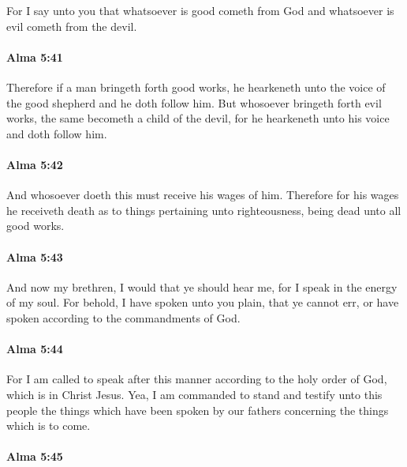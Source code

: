 			For I say unto you
			that whatsoever is good cometh from God
			and whatsoever is evil cometh from the devil.

		\paragraph{Alma 5:41} %
			\label{ALMA-5-41}

			Therefore if a man bringeth forth good works,
			he hearkeneth unto the voice of the good shepherd
			and he doth follow him.
			But whosoever bringeth forth evil works,
			the same becometh a child of the devil,
			for he hearkeneth unto his voice and doth follow him.

		\paragraph{Alma 5:42} %
			\label{ALMA-5-42}

			And whosoever doeth this must receive his wages of him.
			Therefore for his wages he receiveth death
			as to things pertaining unto righteousness,
			being dead unto all good works.

		\paragraph{Alma 5:43} %
			\label{ALMA-5-43}

			And now my brethren, I would that ye should hear me,
			for I speak in the energy of my soul.
			For behold, I have spoken unto you plain,
			that ye cannot err,
			or have spoken according to the commandments of God.

		\paragraph{Alma 5:44} %
			\label{ALMA-5-44}

			For I am called to speak after this manner
			according to the holy order of God, which is in Christ Jesus.
			Yea, I am commanded to stand and testify unto this people
			the things which have been spoken by our fathers
			concerning the things which is to come.

		\paragraph{Alma 5:45} %
			\label{ALMA-5-45}

